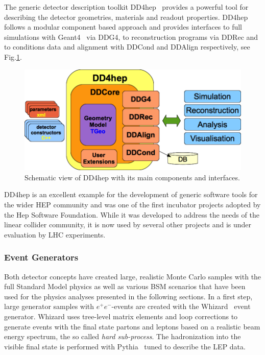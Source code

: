 The generic detector description toolkit DD4hep~\cite{Frank:2014zya,Frank:2015ivo} provides a powerful tool for describing
the detector geometries, materials and readout properties. DD4hep follows a modular component based approach and provides
interfaces to full simulations with Geant4~\cite{Agostinelli:2002hh} via DDG4, to reconstruction programs via DDRec and to
conditions data and alignment with DDCond and DDAlign respectively, see Fig.\ref{fig:dd4hep}.
\begin{figure}
\begin{center}
\includegraphics[width=0.90\hsize]{chapters/figures/dd4hep_simple_schema.png}
\end{center}
\caption{Schematic view of DD4hep with its main components and interfaces.}
\label{fig:dd4hep}
\end{figure}
DD4hep is an excellent example for the development of generic software tools for the wider HEP community and was one of the
first incubator projects adopted by the Hep Software Foundation. While it was developed to address the needs of the linear
collider community, it is now used by several other projects and is under evaluation by LHC experiments.



\subsubsection{Event Generators}

Both detector concepts have created large, realistic Monte Carlo samples with the full Standard Model physics as well as various
BSM scenarios that have been used for the physics analyses presented in the following sections.
In a first step, large generator samples with $e^+e^-$-events are created with the Whizard~\cite{Kilian:2007gr} event generator.
Whizard uses tree-level matrix elements and loop corrections to generate events with the final state partons and leptons
based on a realistic beam energy spectrum, the so called \emph{hard sub-process}. The hadronization into the visible final state
is performed with Pythia~\cite{Sjostrand:2006za} tuned to describe the LEP data.

